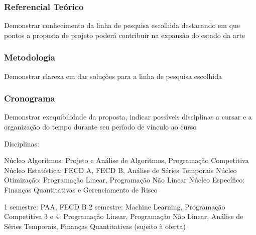 \documentclass[a4paper, 12pt]{article}
\begin{document}

\subsubsection*{Referencial Teórico}

Demonstrar conhecimento da linha de pesquisa escolhida destacando em que
pontos a proposta de projeto poderá contribuir na expansão do estado da arte

\subsubsection*{Metodologia}

Demonstrar clareza em dar soluções para a linha de pesquisa escolhida

\subsubsection*{Cronograma}

Demonstrar exequibilidade da proposta, indicar possíveis disciplinas a cursar
e a organização do tempo durante seu período de vínculo ao curso

Disciplinas:

Núcleo Algoritmos: Projeto e Análise de Algoritmos, Programação Competitiva
Núcleo Estatística: FECD A, FECD B, Análise de Séries Temporais
Núcleo Otimização: Programação Linear, Programação Não Linear
Núcleo Específico: Finanças Quantitativas e Gerenciamento de Risco

1 semestre: PAA, FECD B
2 semestre: Machine Learning, Programação Competitiva
3 e 4: Programação Linear, Programação Não Linear, Análise de Séries Temporais,
Finanças Quantitativas (sujeito à oferta)



\end{document}
